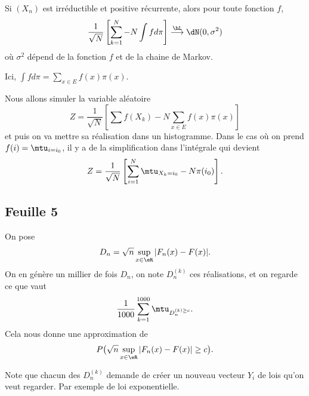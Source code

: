 \begin{theorem}        \label{THOooBCKQooCkoUEV}
	Si \( (X_n)\) est irréductible et positive récurrente, alors pour toute fonction \( f\),
	\begin{equation}
		\frac{1}{ \sqrt{N} }\left[ \sum_{k=1}^N-N\int fd\pi \right]\stackrel{\hL}{\longrightarrow}\dN(0,\sigma^2)
	\end{equation}
	où \( \sigma^2\) dépend de la fonction \( f\) et de la chaine de Markov.

	Ici, \( \int fd\pi=\sum_{x\in E}f(x)\pi(x)\).
\end{theorem}

Nous allons simuler la variable aléatoire
\begin{equation}
	Z=\frac{1}{ \sqrt{N} }\left[ \sum f(X_k)-N\sum_{x\in E} f(x)\pi(x) \right]
\end{equation}
et puis on va mettre sa réalisation dans un histogramme. Dans le cas où on prend \( f(i)=\mtu_{i=i_0}\), il y a de la simplification dans l'intégrale qui devient
\begin{equation}
	Z=\frac{1}{ \sqrt{N} }\left[ \sum_{i=1}^N\mtu_{X_k=i_0}-N\pi(i_0) \right].
\end{equation}

\subsection{Feuille 5}

On pose
\begin{equation}
	D_n=\sqrt{n}\sup_{x\in\eR}| F_n(x)-F(x) |.
\end{equation}
On en génère un millier de fois \( D_n\), on note \( D_n^{(k)}\) ces réalisations, et on regarde ce que vaut
\begin{equation}
	\frac{1}{ 1000 }\sum_{k=1}^{1000}\mtu_{D_n^{(k)\geq c}}.
\end{equation}
Cela nous donne une approximation de
\begin{equation}
	P\big( \sqrt{n}\sup_{x\in\eR}| F_n(x)-F(x) |\geq c \big).
\end{equation}

Note que chacun des \( D_n^{(k)}\) demande de créer un nouveau vecteur \( Y_i\) de lois qu'on veut regarder. Par exemple de loi exponentielle.

